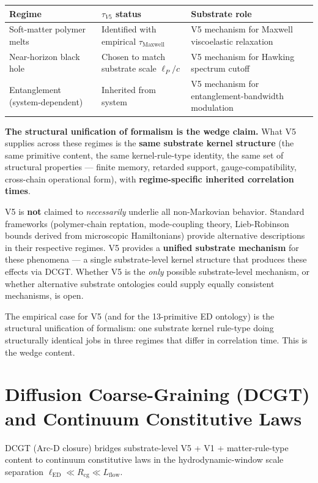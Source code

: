 \documentclass[11pt,a4paper]{article}
\begin{document}
\begin{center}
\begin{tabular}{p{}p{}p{}}
\toprule
\textbf{Regime} & $\tau_{V5}$ \textbf{status} & \textbf{Substrate role} \\
\midrule
Soft-matter polymer melts & Identified with empirical $\tau_\mathrm{Maxwell}$ & V5 mechanism for Maxwell viscoelastic relaxation \\
Near-horizon black hole & Chosen to match substrate scale $\ell_P/c$ & V5 mechanism for Hawking spectrum cutoff \\
Entanglement (system-dependent) & Inherited from system & V5 mechanism for entanglement-bandwidth modulation \\
\bottomrule
\end{tabular}
\end{center}

\textbf{The structural unification of formalism is the wedge claim.} What V5 supplies across these regimes is the \textbf{same substrate kernel structure} (the same primitive content, the same kernel-rule-type identity, the same set of structural properties --- finite memory, retarded support, gauge-compatibility, cross-chain operational form), with \textbf{regime-specific inherited correlation times}.

V5 is \textbf{not} claimed to \emph{necessarily} underlie all non-Markovian behavior. Standard frameworks (polymer-chain reptation, mode-coupling theory, Lieb-Robinson bounds derived from microscopic Hamiltonians) provide alternative descriptions in their respective regimes. V5 provides a \textbf{unified substrate mechanism} for these phenomena --- a single substrate-level kernel structure that produces these effects via DCGT. Whether V5 is the \emph{only} possible substrate-level mechanism, or whether alternative substrate ontologies could supply equally consistent mechanisms, is open.

The empirical case for V5 (and for the 13-primitive ED ontology) is the structural unification of formalism: one substrate kernel rule-type doing structurally identical jobs in three regimes that differ in correlation time. This is the wedge content.

\section{Diffusion Coarse-Graining (DCGT) and Continuum Constitutive Laws}

DCGT (Arc-D closure) bridges substrate-level V5 + V1 + matter-rule-type content to continuum constitutive laws in the hydrodynamic-window scale separation $\ell_\mathrm{ED} \ll R_\mathrm{cg} \ll L_\mathrm{flow}$.
\end{document}
